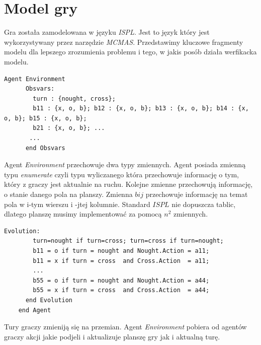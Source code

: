 \section{Model gry}
Gra została zamodelowana w języku \textit{ISPL}. Jest to język który jest wykorzystywany przez narzędzie \textit{MCMAS}.
Przedstawimy kluczowe fragmenty modelu dla lepszego zrozumienia problemu i tego, w jakis posób działa werfikacka modelu.

    
    \begin{lstlisting}[language={}]
    Agent Environment
      Obsvars:
        turn : {nought, cross};
        b11 : {x, o, b}; b12 : {x, o, b}; b13 : {x, o, b}; b14 : {x, o, b}; b15 : {x, o, b};
        b21 : {x, o, b}; ... 
       ...
      end Obsvars
    \end{lstlisting}
    Agent \textit{Environment} przechowuje dwa typy zmiennych. Agent posiada zmienną typu \textit{enumerate} czyli typu wyliczanego 
    która przechowuje informację o tym, który z graczy jest aktualnie na ruchu. Kolejne zmienne przechowują informację, o stanie 
    danego pola na planszy. Zmienna $bij$ przechowuje informację na temat pola w i-tym wierszu i -jtej kolumnie. Standard $ISPL$
    nie dopuszcza tablic, dlatego planszę musimy implementować za pomocą $n^{2}$ zmiennych. 
    \begin{lstlisting}[language={}]
      Evolution:
        turn=nought if turn=cross; turn=cross if turn=nought;
        b11 = o if turn = nought and Nought.Action = a11;
        b11 = x if turn = cross  and Cross.Action  = a11;
        ...
        b55 = o if turn = nought and Nought.Action = a44;
        b55 = x if turn = cross  and Cross.Action  = a44;
      end Evolution
    end Agent
     \end{lstlisting}
     Tury graczy zmieniją się na przemian. Agent \textit{Environment} pobiera od agentów graczy akcji jakie podjeli i aktualizuje 
     planszę gry jak i aktualną turę.
    
